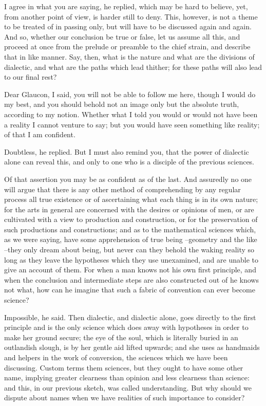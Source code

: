 I agree in what you are saying, he replied, which may be hard to believe, yet, from another point of view, is harder still to deny. This, however, is not a theme to be treated of in passing only, but will have to be discussed again and again. And so, whether our conclusion be true or false, let us assume all this, and proceed at once from the prelude or preamble to the chief strain, and describe that in like manner. Say, then, what is the nature and what are the divisions of dialectic, and what are the paths which lead thither; for these paths will also lead to our final rest?

Dear Glaucon, I said, you will not be able to follow me here, though I would do my best, and you should behold not an image only but the absolute truth, according to my notion. Whether what I told you would or would not have been a reality I cannot venture to say; but you would have seen something like reality; of that I am confident.

Doubtless, he replied.
But I must also remind you, that the power of dialectic alone can reveal this, and only to one who is a disciple of the previous sciences.

Of that assertion you may be as confident as of the last.
And assuredly no one will argue that there is any other method of comprehending by any regular process all true existence or of ascertaining what each thing is in its own nature; for the arts in general are concerned with the desires or opinions of men, or are cultivated with a view to production and construction, or for the preservation of such productions and constructions; and as to the mathematical sciences which, as we were saying, have some apprehension of true being --geometry and the like --they only dream about being, but never can they behold the waking reality so long as they leave the hypotheses which they use unexamined, and are unable to give an account of them. For when a man knows not his own first principle, and when the conclusion and intermediate steps are also constructed out of he knows not what, how can he imagine that such a fabric of convention can ever become science?

Impossible, he said.
Then dialectic, and dialectic alone, goes directly to the first principle and is the only science which does away with hypotheses in order to make her ground secure; the eye of the soul, which is literally buried in an outlandish slough, is by her gentle aid lifted upwards; and she uses as handmaids and helpers in the work of conversion, the sciences which we have been discussing. Custom terms them sciences, but they ought to have some other name, implying greater clearness than opinion and less clearness than science: and this, in our previous sketch, was called understanding. But why should we dispute about names when we have realities of such importance to consider?


